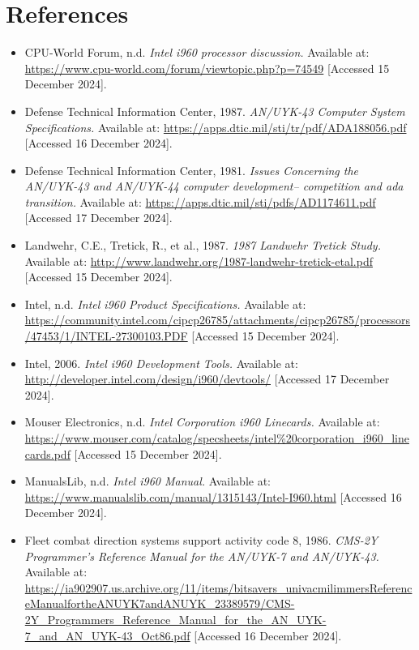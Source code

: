 \documentclass{article}
\begin{document}
\section{References}
\begin{itemize}
\item CPU-World Forum, n.d. \textit{Intel i960 processor discussion.} Available at: \url{https://www.cpu-world.com/forum/viewtopic.php?p=74549} [Accessed 15 December 2024].
\item Defense Technical Information Center, 1987. \textit{AN/UYK-43 Computer System Specifications.} Available at: \url{https://apps.dtic.mil/sti/tr/pdf/ADA188056.pdf} [Accessed 16 December 2024].
\item Defense Technical Information Center, 1981. \textit{Issues Concerning the AN/UYK-43 and AN/UYK-44 computer development--
competition and ada transition.} Available at: \url{https://apps.dtic.mil/sti/pdfs/AD1174611.pdf} [Accessed 17 December 2024].
\item Landwehr, C.E., Tretick, R., et al., 1987. \textit{1987 Landwehr Tretick Study.} Available at: \url{http://www.landwehr.org/1987-landwehr-tretick-etal.pdf} [Accessed 15 December 2024].

\item Intel, n.d. \textit{Intel i960 Product Specifications.} Available at: \url{https://community.intel.com/cipcp26785/attachments/cipcp26785/processors/47453/1/INTEL-27300103.PDF} [Accessed 15 December 2024].

\item Intel, 2006. \textit{Intel i960 Development Tools.} Available at: \url{http://developer.intel.com/design/i960/devtools/} [Accessed 17 December 2024].


\item Mouser Electronics, n.d. \textit{Intel Corporation i960 Linecards.} Available at: \url{https://www.mouser.com/catalog/specsheets/intel%20corporation_i960_linecards.pdf} [Accessed 15 December 2024].

\item ManualsLib, n.d. \textit{Intel i960 Manual.} Available at: \url{https://www.manualslib.com/manual/1315143/Intel-I960.html} [Accessed 16 December 2024].

\item Fleet combat direction systems support activity code 8, 1986. \textit{CMS-2Y Programmer's Reference Manual for the AN/UYK-7 and AN/UYK-43.} Available at: \url{https://ia902907.us.archive.org/11/items/bitsavers_univacmilimmersReferenceManualfortheANUYK7andANUYK_23389579/CMS-2Y_Programmers_Reference_Manual_for_the_AN_UYK-7_and_AN_UYK-43_Oct86.pdf} [Accessed 16 December 2024].


\end{itemize}
\end{document}
